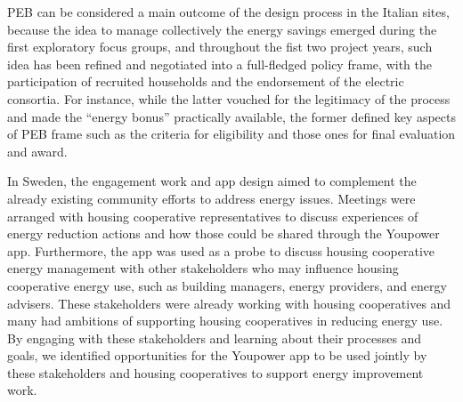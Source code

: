 PEB can be considered a main outcome of the design process in the Italian sites, because 
the idea to manage collectively the energy savings emerged during the first exploratory focus groups,
and throughout the fist two project years, such idea has been refined and negotiated into
a full-fledged policy frame, with the participation of recruited households and the endorsement
of the electric consortia. For instance, while the latter vouched for the legitimacy of the process
and made the ``energy bonus'' practically available, the former defined key aspects of PEB frame such as the criteria for eligibility and those ones for final evaluation and award.  


In Sweden, the engagement work and app design aimed to complement the already existing community efforts to address energy issues. Meetings were arranged with housing cooperative representatives to discuss experiences of energy reduction actions and how those could be shared through the Youpower app. Furthermore, the app was used as a probe to discuss housing cooperative energy management with other stakeholders who may influence housing cooperative energy use, such as building managers, energy providers, and energy advisers. These stakeholders were already working with housing cooperatives and many had ambitions of supporting housing cooperatives in reducing energy use. By engaging with these stakeholders and learning about their processes and goals, we identified opportunities for the Youpower app to be used jointly by these stakeholders and housing cooperatives to support energy improvement work.

